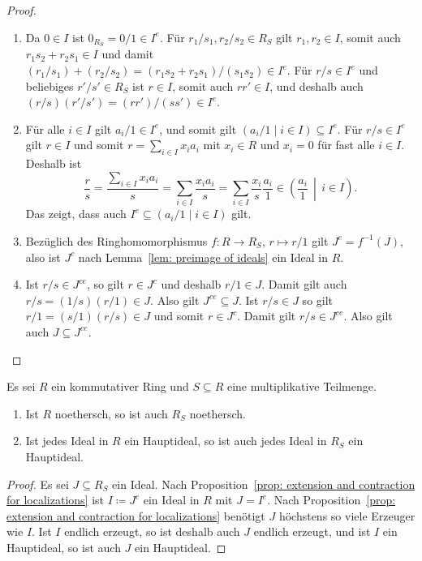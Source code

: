 \documentclass[a4paper,10pt]{scrartcl}
\begin{document}
\begin{proof}
  \begin{enumerate}
    \item
      Da $0 \in I$ ist $0_{R_S} = 0/1 \in I^e$.
      Für $r_1/s_1, r_2/s_2 \in R_S$ gilt $r_1, r_2 \in I$, somit auch $r_1 s_2 + r_2 s_1 \in I$ und damit $(r_1/s_1) + (r_2/s_2) = (r_1 s_2 + r_2 s_1)/(s_1 s_2) \in I^e$.
      Für $r/s \in I^e$ und beliebiges $r'/s' \in R_S$ ist $r \in I$, somit auch $r r' \in I$, und deshalb auch $(r/s)(r'/s') = (r r')/(s s') \in I^e$.
    \item
      Für alle $i \in I$ gilt $a_i/1 \in I^e$, und somit gilt $(a_i/1 \mid i \in I) \subseteq I^e$.
      Für $r/s \in I^e$ gilt $r \in I$ und somit $r = \sum_{i \in I} x_i a_i$ mit $x_i \in R$ und $x_i = 0$ für fast alle $i \in I$.
      Deshalb ist
      \[
            \frac{r}{s}
        =   \frac{\sum_{i \in I} x_i a_i}{s}
        =   \sum_{i \in I} \frac{x_i a_i}{s}
        =   \sum_{i \in I} \frac{x_i}{s} \frac{a_i}{1}
        \in \left( \frac{a_i}{1} \,\middle|\, i \in I \right).
      \]
      Das zeigt, dass auch $I^e \subseteq (a_i/1 \mid i \in I)$ gilt.
    \item
      Bezüglich des Ringhomomorphismus $f \colon R \to R_S$, $r \mapsto r/1$ gilt $J^c = f^{-1}(J)$, also ist $J^c$ nach Lemma~\ref{lem: preimage of ideals} ein Ideal in $R$.
    \item
      Ist $r/s \in J^{ce}$, so gilt $r \in J^c$ und deshalb $r/1 \in J$.
      Damit gilt auch $r/s = (1/s)(r/1) \in J$.
      Also gilt $J^{ce} \subseteq J$.
      Ist $r/s \in J$ so gilt $r/1 = (s/1)(r/s) \in J$ und somit $r \in J^c$.
      Damit gilt $r/s \in J^{ce}$.
      Also gilt auch $J \subseteq J^{ce}$.
  \end{enumerate}
\end{proof}


\begin{corollary}
  Es sei $R$ ein kommutativer Ring und $S \subseteq R$ eine multiplikative Teilmenge.
  \begin{enumerate}
    \item
      Ist $R$ noethersch, so ist auch $R_S$ noethersch.
    \item
      Ist jedes Ideal in $R$ ein Hauptideal, so ist auch jedes Ideal in $R_S$ ein Hauptideal.
  \end{enumerate}
\end{corollary}


\begin{proof}
  Es sei $J \subseteq R_S$ ein Ideal.
  Nach Proposition~\ref{prop: extension and contraction for localizations} ist $I \coloneqq J^c$ ein Ideal in $R$ mit $J = I^e$.
  Nach Proposition~\ref{prop: extension and contraction for localizations} benötigt $J$ höchstens so viele Erzeuger wie $I$.
  Ist $I$ endlich erzeugt, so ist deshalb auch $J$ endlich erzeugt, und ist $I$ ein Hauptideal, so ist auch $J$ ein Hauptideal.
\end{proof}
\end{document}
